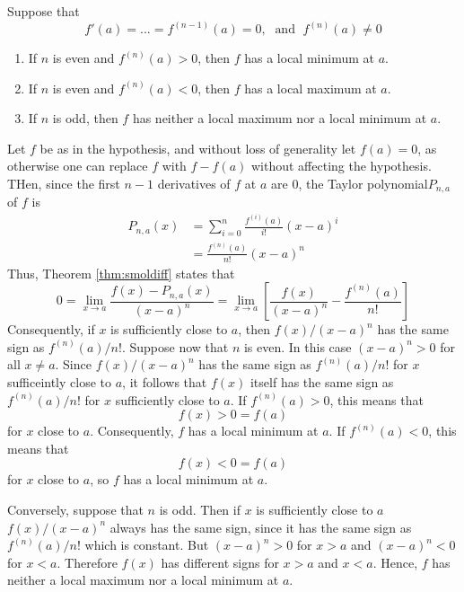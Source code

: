 \documentclass[12pt]{report}
\begin{document}
\begin{thm}{}{}
    Suppose that \begin{equation*}
        f'(a) = ... = f^{(n-1)}(a) = 0,\;\text{ and }\;f^{(n)}(a) \neq 0
    \end{equation*}
    \begin{enumerate}
        \item If $n$ is even and $f^{(n)}(a) > 0$, then $f$ has a local minimum at $a$.
        \item If $n$ is even and $f^{(n)}(a) < 0$, then $f$ has a local maximum at $a$.
        \item If $n$ is odd, then $f$ has neither a local maximum nor a local minimum at $a$.
    \end{enumerate}
\end{thm}
\begin{proof*}{}{}
    Let $f$ be as in the hypothesis, and without loss of generality let $f(a) = 0$, as otherwise one can replace $f$ with $f-f(a)$ without affecting the hypothesis. THen, since the first $n-1$ derivatives of $f$ at $a$ are $0$, the Taylor polynomial$ P_{n,a}$ of $f$ is \begin{align*}
        P_{n,a}(x) &= \sum\limits_{i=0}^n\frac{f^{(i)}(a)}{i!}(x-a)^i \\
        &= \frac{f^{(n)}(a)}{n!}(x-a)^n 
    \end{align*}
    Thus, Theorem \ref{thm:smoldiff} states that \begin{equation*}
        0 = \lim\limits_{x\rightarrow a} \frac{f(x) - P_{n,a}(x)}{(x-a)^n} = \lim\limits_{x\rightarrow a} \left[\frac{f(x)}{(x-a)^n} - \frac{f^{(n)}(a)}{n!}\right]
    \end{equation*}
    Consequently, if $x$ is sufficiently close to $a$, then $f(x)/(x-a)^n$ has the same sign as $f^{(n)}(a)/n!$. Suppose now that $n$ is even. In this case $(x-a)^n > 0$ for all $x \neq a$. Since $f(x)/(x-a)^n$ has the same sign as $f^{(n)}(a)/n!$ for $x$ sufficeintly close to $a$, it follows that $f(x)$ itself has the same sign as $f^{(n)}(a)/n!$ for $x$ sufficiently close to $a$. If $f^{(n)}(a) > 0$, this means that \begin{equation*}
        f(x) > 0 = f(a)
    \end{equation*}
    for $x$ close to $a$. Consequently, $f$ has a local minimum at $a$. If $f^{(n)}(a) < 0$, this means that \begin{equation*}
        f(x) < 0 = f(a)
    \end{equation*}
    for $x$ close to $a$, so $f$ has a local minimum at $a$.

    Conversely, suppose that $n$ is odd. Then if $x$ is sufficiently close to $a$ $f(x)/(x-a)^n$ always has the same sign, since it has the same sign as $f^{(n)}(a)/n!$ which is constant. But $(x-a)^n >0$ for $x >a$ and $(x-a)^n < 0$ for $x < a$. Therefore $f(x)$ has different signs for $x > a$ and $x <a$. Hence, $f$ has neither a local maximum nor a local minimum at $a$.
\end{proof*}
\end{document}
